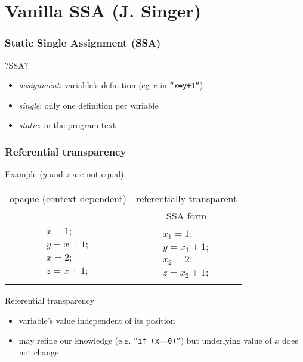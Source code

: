 \section{Vanilla SSA (J. Singer)}

\begin{frame}
  \frametitle{Static Single Assignment (SSA)}
\begin{block}{?SSA?}
  \begin{itemize}
    \item \emph{assignment}: variable's definition (eg $x$ in \texttt{``x=y+1''})
    \item \emph{single}: only one definition per variable
    \item \emph{static}: in the program text
  \end{itemize}
\end{block}
\end{frame}

\begin{frame}
\frametitle{Referential transparency}
\begin{block}{Example ($y$ and $z$ are not equal)}
\begin{tabular}{c|c}
opaque (context dependent)& referentially transparent\\
 & SSA form\\ \hline
\begin{minipage}{0.45\textwidth}
\begin{equation*}
\begin{array}{l}
x = 1;\\
y = x + 1;\\
x = 2;\\
z = x + 1;\\
\end{array}
\end{equation*}
\end{minipage} &
\begin{minipage}{0.35\textwidth}
\begin{equation*}
\begin{array}{l}
x_1 = 1;\\
y  = x_1 + 1;\\
x_2 = 2;\\
z  = x_2 + 1;
\end{array}
\end{equation*}
\end{minipage}
\end{tabular}
\end{block}
\begin{exampleblock}{Referential transparency}
\begin{itemize}
\item variable's value independent of its position
\item may refine our knowledge (e.g. \texttt{``if (x==0)''}) but underlying value of $x$ does not change
\end{itemize}
\end{exampleblock}
\end{frame}

